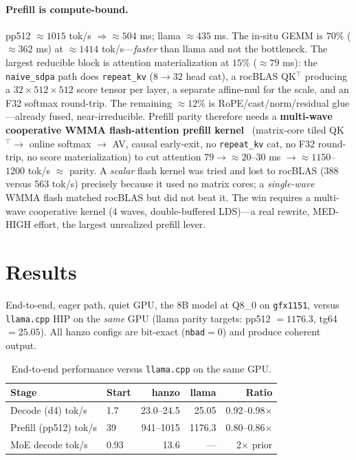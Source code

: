 \documentclass[11pt]{article}
\begin{document}
\paragraph{Prefill is compute-bound.} pp512 $\approx 1015$ tok/s $\Rightarrow \approx 504$ ms; llama $\approx 435$ ms. The in-situ GEMM is $70\%$ ($\approx 362$ ms) at $\approx 1414$ tok/s---\emph{faster} than llama and not the bottleneck. The largest reducible block is attention materialization at $15\%$ ($\approx 79$ ms): the \texttt{naive\_sdpa} path does \texttt{repeat\_kv} ($8\to 32$ head cat), a rocBLAS QK$^\top$ producing a $32{\times}512{\times}512$ score tensor per layer, a separate affine-mul for the scale, and an F32 softmax round-trip. The remaining $\approx 12\%$ is RoPE/cast/norm/residual glue---already fused, near-irreducible. Prefill parity therefore needs a \textbf{multi-wave cooperative WMMA flash-attention prefill kernel}~\cite{dao2022} (matrix-core tiled QK$^\top \to$ online softmax $\to$ AV, causal early-exit, no \texttt{repeat\_kv} cat, no F32 round-trip, no score materialization) to cut attention $79 \to \approx 20$--$30$ ms $\to \approx 1150$--$1200$ tok/s $\approx$ parity. A \emph{scalar} flash kernel was tried and lost to rocBLAS ($388$ versus $563$ tok/s) precisely because it used no matrix cores; a \emph{single-wave} WMMA flash matched rocBLAS but did not beat it. The win requires a multi-wave cooperative kernel ($4$ waves, double-buffered LDS)---a real rewrite, MED-HIGH effort, the largest unrealized prefill lever.

\section{Results}

End-to-end, eager path, quiet GPU, the 8B model at Q8\_0 on \texttt{gfx1151}, versus \texttt{llama.cpp} HIP on the \emph{same} GPU (llama parity targets: pp512 $=1176.3$, tg64 $=25.05$). All hanzo configs are bit-exact (\texttt{nbad}$=0$) and produce coherent output.

\begin{table}[h]
\centering
\caption{End-to-end performance versus \texttt{llama.cpp} on the same GPU.}
\label{tab:e2e}
\begin{tabular}{llrrr}
\toprule
\textbf{Stage} & \textbf{Start} & \textbf{hanzo} & \textbf{llama} & \textbf{Ratio} \\
\midrule
Decode (d4) tok/s   & 1.7   & 23.0--24.5 & 25.05 & 0.92--0.98$\times$ \\
Prefill (pp512) tok/s & 39  & 941--1015 & 1176.3 & 0.80--0.86$\times$ \\
MoE decode tok/s    & 0.93  & 13.6 & --- & 2$\times$ prior \\
\bottomrule
\end{tabular}
\end{table}
\end{document}

